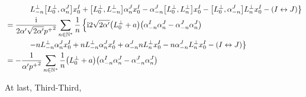 \begin{align*}
    &\quad\quad\quad\left.L^\perp_{-n}\comm{L_0^\perp}{\alpha_n^J}x_0^I+\comm{L_0^\perp}{L^\perp_{-n}}\alpha_n^Jx_0^I-\alpha^J_{-n}\comm{L_0^\perp}{L^\perp_n}x_0^I-\comm{L_0^\perp}{\alpha^J_{-n}}L^\perp_nx_0^I-\qty(I\leftrightarrow J)\right\}\\
    &=\frac{\im}{2\alpha'\sqrt{2\alpha'}{p^+}^2}\sum\limits_{n\in\mathbb N^\ast}\frac1n\left\{\im2\sqrt{2\alpha'}\qty(L_0^\perp+a)\qty(\alpha_{-n}^I\alpha_n^J-\alpha^J_{-n}\alpha_n^J)\right.\\
    &\quad\quad\quad\left.-nL^\perp_{-n}\alpha_n^Jx_0^I+nL^\perp_{-n}\alpha_n^Jx_0^I+\alpha^J_{-n}nL_{n}^\perp x_0^I-n\alpha^J_{-n}L^\perp_nx_0^I-\qty(I\leftrightarrow J)\right\}\\
    &=-\frac{1}{\alpha'{p^+}^2}\sum\limits_{n\in\mathbb N^\ast}\frac1n\qty(L_0^\perp+a)\qty(\alpha_{-n}^I\alpha_n^J-\alpha^J_{-n}\alpha_n^J)
\end{align*}

At last, Third-Third,

